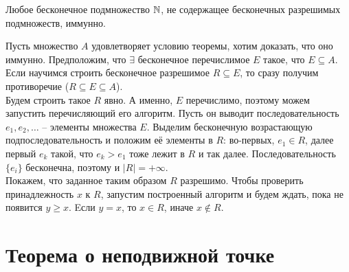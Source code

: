 \begin{thm}
    Любое бесконечное подмножество $ \mathbb{N}$, не содержащее бесконечных разрешимых \\ подмножеств, иммунно.
\end{thm}
\begin{proof*}
    Пусть множество $ A$ удовлетворяет условию теоремы, хотим доказать, что оно иммунно. Предположим, что $ \exists$ бесконечное перечислимое $ E$ такое, что $ E \subseteq A$. Если научимся строить бесконечное разрешимое $ R \subseteq E$, то сразу получим противоречие ($ R \subseteq E \subseteq A$). \\
    Будем строить такое $ R$ явно. А именно, $ E$ перечислимо, поэтому можем запустить перечисляющий его алгоритм. Пусть он выводит последовательность $ e_1, e_2, \ldots$ -- элементы множества $ E$. Выделим бесконечную возрастающую подпоследовательность и положим её элементы в $ R$: во-первых, $ e_1 \in R$, далее первый $ e_k$ такой, что $ e_k > e_1$ тоже лежит в $ R$ и так далее. Последовательность $ \{e_i\}$ бесконечна, поэтому и $ |R| = +\infty$.\\
    Покажем, что заданное таким образом $ R$ разрешимо. Чтобы проверить принадлежность $ x$ к $ R$, запустим построенный алгоритм и будем ждать, пока не появится $ y \ge x$. Eсли $ y = x$, то $ x \in R$, иначе $ x \notin R$.
\end{proof*}


\section{Теорема о неподвижной точке}

